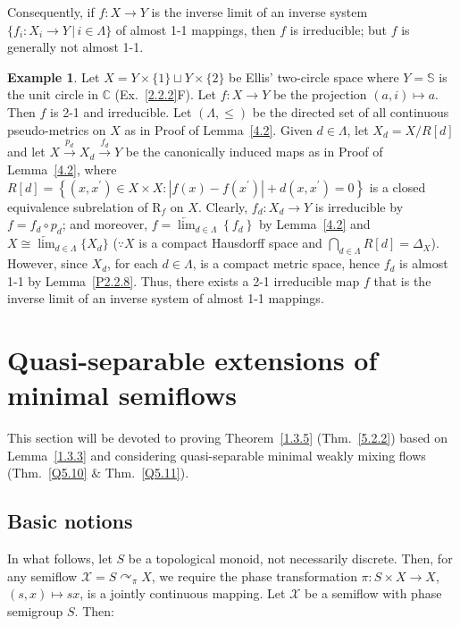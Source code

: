 \documentclass[12pt,final,3p,times]{elsarticle}
\theoremstyle{definition}
\newtheorem{exa}[thm]{Example}
\numberwithin{equation}{section}
\begin{document}
Consequently, if $f\colon X\rightarrow Y$ is the inverse limit of an inverse system $\{f_i\colon X_i\rightarrow Y\,|\,i\in\Lambda\}$ of almost 1-1 mappings, then $f$ is irreducible; but $f$ is generally not almost 1-1.

\begin{exa}\label{4.8}
    Let $X=Y\times\{1\}\sqcup Y\times\{2\}$ be Ellis' two-circle space where $Y=\mathbb{S}$ is the unit circle in $\mathbb{C}$ (Ex.~\ref{2.2.2}F). Let $f\colon X\rightarrow Y$ be the projection $(a,i)\mapsto a$.
    Then $f$ is 2-1 and irreducible.
    Let $(\Lambda,\le)$ be the directed set of all continuous pseudo-metrics on $X$ as in Proof of Lemma~\ref{4.2}. Given $d\in\Lambda$, let $X_d=X/R[d]$ and let $X\xrightarrow{p_d}X_d\xrightarrow{f_d}Y$ be the canonically induced maps as in Proof of Lemma~\ref{4.2}, where 
    $R[d]=\left\{(x,x^\prime)\in X\times X\colon |f(x)-f(x^\prime)|+d(x,x^\prime)=0\right\}$ 
    is a closed equivalence subrelation of $\mathrm{R}_f$ on $X$.
    Clearly, $f_d\colon X_d\rightarrow Y$ is irreducible by $f=f_d\circ p_d$; and moreover, $f=\underleftarrow{\lim}_{d\in\Lambda}\left\{f_d\right\}$ by Lemma~\ref{4.2} and $X\cong\underleftarrow{\lim}_{d\in\Lambda}\{X_d\}$ ($\because X$ is a compact Hausdorff space and $\bigcap_{d\in\Lambda}R[d]=\varDelta_X$). However, since $X_d$, for each $d\in\Lambda$, is a compact metric space, hence $f_d$ is almost 1-1 by Lemma~\ref{P2.2.8}. Thus, there exists a 2-1 irreducible map $f$ that is the inverse limit of an inverse system of almost 1-1 mappings.
\end{exa}

\section{Quasi-separable extensions of minimal semiflows}\label{s5}
This section will be devoted to proving Theorem~\ref{1.3.5} (Thm.~\ref{5.2.2}) based on Lemma~\ref{1.3.3} and considering quasi-separable minimal weakly mixing flows (Thm.~\ref{Q5.10} $\&$ Thm.~\ref{Q5.11}). 

\subsection{Basic notions}
In what follows, let $S$ be a topological monoid, not necessarily discrete. Then, for any semiflow $\mathscr{X}=S\curvearrowright_\pi X$, we require the phase transformation $\pi\colon S\times X\rightarrow X$, $(s,x)\mapsto sx$, is a jointly continuous mapping.
Let $\mathscr{X}$ be a semiflow with phase semigroup $S$. Then:
\end{document}
